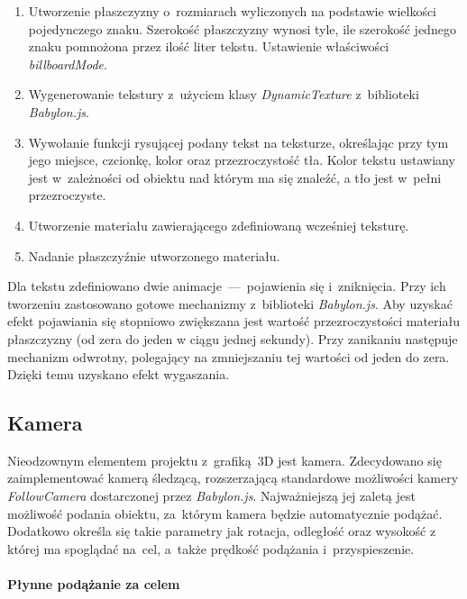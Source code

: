 \documentclass[12pt,a4paper,polish,thesis]{dcsbook}
\begin{document}
{	\begin{enumerate}
		\item Utworzenie płaszczyzny o~rozmiarach wyliczonych na podstawie wielkości pojedynczego znaku. Szerokość płaszczyzny wynosi tyle, ile szerokość jednego znaku pomnożona przez ilość liter tekstu. Ustawienie właściwości \textit{billboardMode}.

		\item Wygenerowanie tekstury z~użyciem klasy \textit{DynamicTexture} z~biblioteki \textit{Babylon.js}.

		\item Wywołanie funkcji rysującej podany tekst na teksturze, określając przy tym jego miejsce, czcionkę, kolor oraz przezroczystość tła. Kolor tekstu ustawiany jest w~zależności od obiektu nad którym ma się znaleźć, a tło jest w~pełni przezroczyste.

		\item Utworzenie materiału zawierającego zdefiniowaną wcześniej teksturę.

		\item Nadanie płaszczyźnie utworzonego materiału.
	\end{enumerate}

	Dla tekstu zdefiniowano dwie animacje~---~pojawienia się i~zniknięcia. Przy ich tworzeniu zastosowano gotowe mechanizmy z~biblioteki \textit{Babylon.js}. Aby uzyskać efekt pojawiania się stopniowo zwiększana jest wartość przezroczystości materiału płaszczyzny (od zera do jeden w ciągu jednej sekundy). Przy zanikaniu następuje mechanizm odwrotny, polegający na zmniejszaniu tej wartości od jeden do zera. Dzięki temu uzyskano efekt wygaszania.

	\subsection{Kamera} \label{camera}

	Nieodzownym elementem projektu z~grafiką~3D jest kamera. Zdecydowano się zaimplementować kamerą śledzącą, rozszerzającą standardowe możliwości kamery \textit{FollowCamera} dostarczonej przez \textit{Babylon.js}. Najważniejszą jej zaletą jest możliwość podania obiektu, za~którym kamera będzie automatycznie podążać. Dodatkowo określa się takie parametry jak rotacja, odległość oraz wysokość z której ma spoglądać na~cel, a~także prędkość podążania i~przyspieszenie.

	\paragraph{Płynne podążanie za celem}

}
\end{document}
